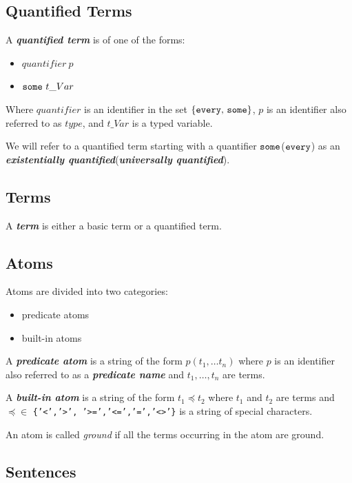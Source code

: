 \documentclass[a4paper,10pt]{article}
\begin{document}
\subsection{Quantified Terms}

A \textit{\textbf{quantified term}} is of one of the forms:
\begin{itemize}
\item $ quantifier~p $
\item $ \mbox{\texttt{some}}~t\_Var$
\end{itemize} 


Where $quantifier$ is an identifier in the set $\{\mbox{\texttt{every}, \texttt{some}}\}$, $p$ is an identifier also referred to as $type$,  and $t\_Var$ is a typed variable.

We will refer to a quantified term starting with a quantifier $\mbox{\texttt{some}}$($\mbox{\texttt{every}}$) as an \textbf{\textit{existentially quantified}}(\textbf{\textit{universally quantified}}).  


\subsection{Terms}
A \textit{\textbf{term}} is either a basic term or a quantified term.
\subsection{Atoms}

Atoms are divided into two categories:
\begin{itemize}
\item predicate atoms
\item built-in atoms
\end{itemize}

A \textit{\textbf{predicate atom}} is a string of the form $p(t_1,\ldots t_n)$ where 
$p$ is an identifier also referred to as a \textbf{\textit{predicate name}} and $t_1,\ldots,t_n$ are terms.

A \textit{\textbf{built-in atom}} is a string of the form $t_1 \preceq t_2$ where $t_1$ and $t_2$ are terms and $\preceq \in$ \texttt{\{'<','>', '>=','<=','=','<>'\}} is a string of special characters.

An atom is called \textit{ground} if all the terms occurring in the atom are ground.
\subsection{Sentences}
\end{document}

